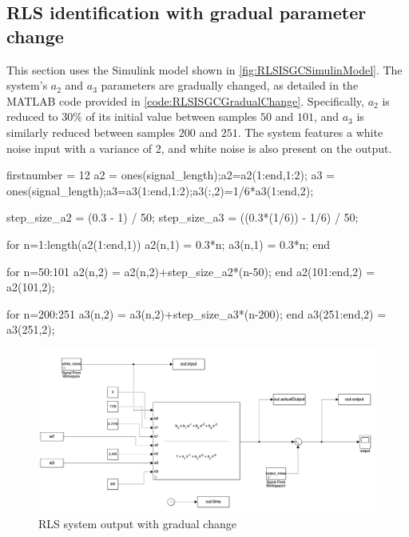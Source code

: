 \FloatBarrier
\subsection{RLS identification with gradual parameter change}
This section uses the Simulink model shown in \autoref{fig:RLSISGCSimulinModel}. The system's $a_2$ and $a_3$ parameters are gradually changed, as detailed in the MATLAB code provided in \autoref{code:RLSISGCGradualChange}. Specifically, $a_2$ is reduced to $30\%$ of its initial value between samples $50$ and $101$, and  $a_3$ is similarly reduced between samples $200$ and $251$. The system features a white noise input with a variance of $2$, and white noise is also present on the output.

\begin{code}
	\begin{matlabcode}{firstnumber = 12}
	a2 = ones(signal_length);a2=a2(1:end,1:2);
	a3 = ones(signal_length);a3=a3(1:end,1:2);a3(:,2)=1/6*a3(1:end,2);
	
	step_size_a2 = (0.3 - 1) / 50;
	step_size_a3 = ((0.3*(1/6)) - 1/6) / 50;
	
	for n=1:length(a2(1:end,1))
	a2(n,1) = 0.3*n;
	a3(n,1) = 0.3*n;
	end
	
	for n=50:101
	a2(n,2) = a2(n,2)+step_size_a2*(n-50);
	end
	a2(101:end,2) = a2(101,2);
	
	for n=200:251
	a3(n,2) = a3(n,2)+step_size_a3*(n-200);
	end
	a3(251:end,2) = a3(251,2);
	\end{matlabcode}
	\label{code:RLSISGCGradualChange}
\end{code}



\begin{figure}
	\centering
	\includegraphics[totalheight=8cm]{images/RLSISGCSimulinkModel.png}
	\caption{RLS system output with gradual change}
	\label{fig:RLSISGCSimulinModel}
\end{figure}

